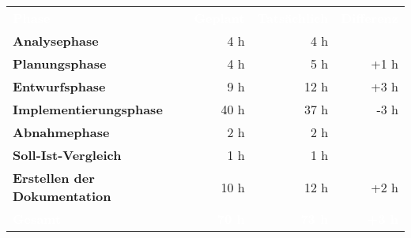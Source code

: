 \begin{tabular}{lrrr}
\rowcolor{heading}\textcolor{white}{\textbf{Phase}} &
\textcolor{white}{\textbf{Geplant}} & \textcolor{white}{\textbf{Tatsächlich}} &
\textcolor{white}{\textbf{Differenz}}
\\

\rowcolor{odd}\textbf{Analysephase} & 4 h   & 4 h  &  \\
\textbf{Planungsphase} & 4 h  & 5 h  &  +1 h\\
\textbf{Entwurfsphase} & 9 h  & 12 h  & +3 h \\
\textbf{Implementierungsphase} & 40 h  & 37 h  & -3 h \\
\rowcolor{odd}\textbf{Abnahmephase} & 2 h   & 2 h   &  \\
\textbf{Soll-Ist-Vergleich} & 1 h   & 1 h   &  \\
\rowcolor{odd}\textbf{Erstellen der Dokumentation} & 10 h   & 12 h  & +2 h \\

\hline
\hline
\rowcolor{heading}\textcolor{white}{\textbf{Gesamt}} &
\textcolor{white}{\textbf{70 h}} & \textcolor{white}{\textbf{73 h}}  &
\textcolor{white}{\textbf{+3 h}} \\
\end{tabular}
